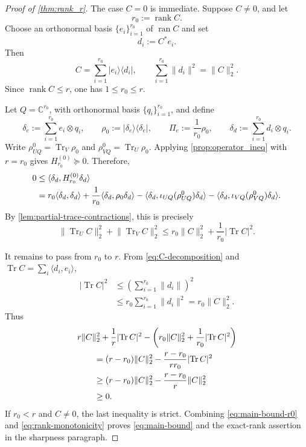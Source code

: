 \documentclass[11pt,reqno]{amsart}
\theoremstyle{remark}
\DeclareMathOperator{\Tr}{Tr}
\DeclareMathOperator{\rank}{rank}
\newcommand{\ketbra}[2]{\lvert #1\rangle\!\langle #2\rvert}
\newcommand{\ip}[2]{\langle #1,#2\rangle}
\newcommand{\norm}[1]{\lVert #1\rVert}
\newcommand{\abs}[1]{\lvert #1\rvert}
\newcommand{\C}{\mathbb C}
\begin{document}
\begin{proof}[Proof of \cref{thm:rank_r}]
The case $C=0$ is immediate. Suppose $C\ne0$, and let
\[
    r_0:=\rank C.
\]
Choose an orthonormal basis
$\{e_i\}_{i=1}^{r_0}$ of $\operatorname{ran}C$ and set
\[
    d_i:=C^*e_i.
\]
Then
\begin{equation}
\label{eq:C-decomposition}
    C
    =
    \sum_{i=1}^{r_0}\ketbra{e_i}{d_i},
    \qquad
    \sum_{i=1}^{r_0}\norm{d_i}^2
    =\norm{C}_2^2.
\end{equation}
Since $\rank C\le r$, one has $1\le r_0\le r$.

Let $Q=\C^{r_0}$, with orthonormal basis
$\{q_i\}_{i=1}^{r_0}$, and define
\[
    \delta_e:=\sum_{i=1}^{r_0}e_i\otimes q_i,
    \qquad
    \rho_0:=\ketbra{\delta_e}{\delta_e},
    \qquad
    \Pi_e:=\frac1{r_0}\rho_0,
    \qquad
    \delta_d:=\sum_{i=1}^{r_0}d_i\otimes q_i.
\]
Write $\rho^0_{UQ}=\Tr_V\rho_0$ and
$\rho^0_{VQ}=\Tr_U\rho_0$. Applying
\cref{prop:operator_ineq} with $r=r_0$ gives
$H_{r_0}^{(0)}\succeq0$. Therefore,
\begin{align}
    0
    &\le
    \ip{\delta_d}{H_{r_0}^{(0)}\delta_d}
    \notag\\
    &=
    r_0\ip{\delta_d}{\delta_d}
    +\frac1{r_0}\ip{\delta_d}{\rho_0\delta_d}
    -\ip{\delta_d}{\iota_{UQ}(\rho^0_{UQ})\delta_d}
    -\ip{\delta_d}{\iota_{VQ}(\rho^0_{VQ})\delta_d}.
\label{eq:H-expectation}
\end{align}
By \cref{lem:partial-trace-contractions}, this is precisely
\begin{equation}
\label{eq:main-bound-r0}
    \norm{\Tr_U C}_2^2+\norm{\Tr_V C}_2^2
    \le
    r_0\norm{C}_2^2
    +\frac1{r_0}\abs{\Tr C}^2.
\end{equation}

It remains to pass from $r_0$ to $r$.  From
\cref{eq:C-decomposition} and
$\Tr C=\sum_i\ip{d_i}{e_i}$,
\[
\begin{aligned}
    \abs{\Tr C}^2
    &\le
    \left(\sum_{i=1}^{r_0}\norm{d_i}\right)^2\\
    &\le
    r_0\sum_{i=1}^{r_0}\norm{d_i}^2
    =r_0\norm{C}_2^2.
\end{aligned}
\]
Thus
\begin{align}
    &
    r\norm{C}_2^2
    +\frac1r\abs{\Tr C}^2
    -\left(
      r_0\norm{C}_2^2
      +\frac1{r_0}\abs{\Tr C}^2
    \right)
    \notag\\
    &\qquad=
    (r-r_0)\norm{C}_2^2
    -\frac{r-r_0}{rr_0}\abs{\Tr C}^2
    \notag\\
    &\qquad\ge
    (r-r_0)\norm{C}_2^2
    -\frac{r-r_0}{r}\norm{C}_2^2
    \notag\\
    &\qquad\ge0.
\label{eq:rank-monotonicity}
\end{align}
If $r_0<r$ and $C\ne0$, the last inequality is strict. Combining
\cref{eq:main-bound-r0} and \cref{eq:rank-monotonicity} proves
\cref{eq:main-bound} and the exact-rank assertion in the sharpness
paragraph.
\end{proof}
\end{document}

